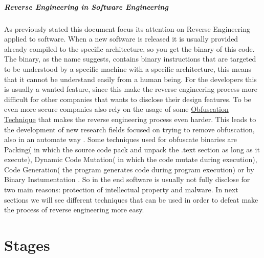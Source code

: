 \documentclass{article}
\begin{document}
\subparagraph{Reverse Engineering in Software Engineering}
As previously stated this document focus its attention on Reverse Engineering applied to software. When a new software is released it is usually provided already compiled to the specific architecture, so you get the binary of this code.
The binary, as the name suggests, contains binary instructions that are targeted to be understood by a specific machine with a specific architecture, this means that it cannot be understand easily from a human being.
For the developers this is usually a wanted feature, since this make the reverse engineering process more difficult for other companies that wants to disclose their design features.
To be even more secure companies also rely on the usage of some \underline{Obfuscation Technique} that makes the reverse engineering process even harder. This leads to the development of new research fields focused on trying to remove obfuscation, also in an automate way \citep{1566145}.
Some techniques used for obfuscate binaries are Packing( in which the source code pack and unpack the .text section as long as it execute)\citep{SlidePackers}, Dynamic Code Mutation( in which the code mutate during execution), Code Generation( the program generates code during program execution) or by Binary Instumentation \cite{paperInstrumentation}.
So in the end software is usually not fully disclose for two main reasons: protection of intellectual property and malware. In next sections we will see different techniques that can be used in order to defeat make the process of reverse engineering more easy.
 
\section{Stages} 
\end{document}
